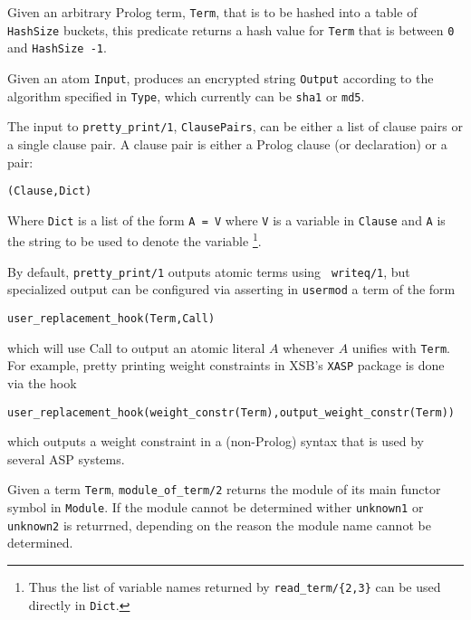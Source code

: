 \begin{description}

%
Given an arbitrary Prolog term, {\tt Term}, that is to be hashed into
a table of {\tt HashSize} buckets, this predicate returns a hash value
for {\tt Term} that is between {\tt 0} and {\tt HashSize -1}.

%
Given an atom {\tt Input}, produces an encrypted string {\tt Output}
according to the algorithm specified in {\tt Type}, which currently
can be {\tt sha1} or {\tt md5}.



%
The input to {\tt pretty\_print/1}, {\tt ClausePairs}, can be either a
list of clause pairs or a single clause pair.  A clause pair is either
a Prolog clause (or declaration) or a pair:
%
\begin{center}
{\tt (Clause,Dict)} 
\end{center}
%
Where {\tt Dict} is a list of the form {\tt A = V} where {\tt V} is a
variable in {\tt Clause} and {\tt A} is the string to be used to
denote the variable \footnote{Thus the list of variable names returned
by {\tt read\_term/\{2,3\}} can be used directly in {\tt Dict}.}.

By default, {\tt pretty\_print/1} outputs atomic terms using {\tt
writeq/1}, but specialized output can be configured via asserting in
{\tt usermod} a term of the form
%
\begin{center}
{\tt user\_replacement\_hook(Term,Call)}
\end{center}
%
which will use Call to output an atomic literal $A$ whenever $A$
unifies with {\tt Term}.  For example, pretty printing weight
constraints in XSB's {\tt XASP} package is done via the hook
%
\begin{center}
{\tt user\_replacement\_hook(weight\_constr(Term),output\_weight\_constr(Term))}
\end{center}
%
which outputs a weight constraint in a (non-Prolog) syntax that is 
used by several ASP systems.

%
Given a term {\tt Term}, {\tt module\_of\_term/2} returns the module
of its main functor symbol in {\tt Module}.  If the module cannot be
determined wither {\tt unknown1} or {\tt unknown2} is returrned,
depending on the reason the module name cannot be determined.

\end{description}


